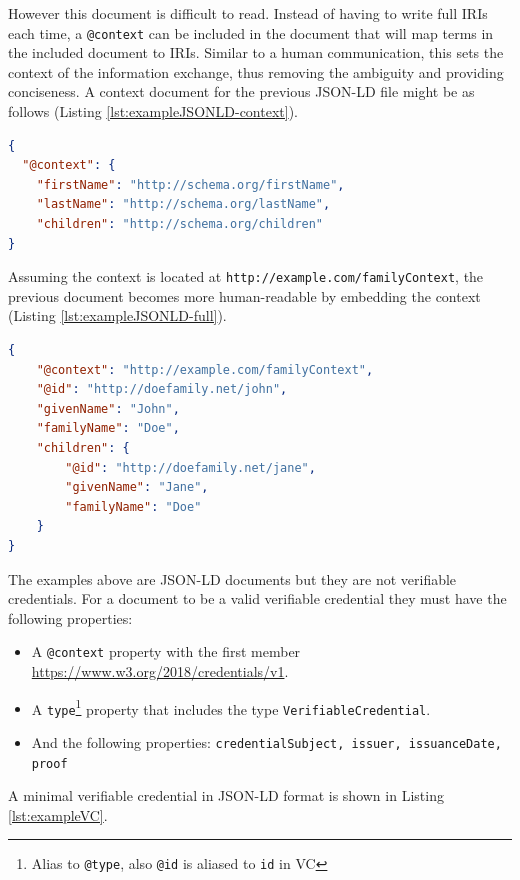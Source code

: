 However this document is difficult to read. Instead of having to write full \acrshort{IRI}s each time, a \lstinline{@context} can be included in the document that will map terms in the included document to \acrshort{IRI}s. Similar to a human communication, this sets the context of the information exchange, thus removing the ambiguity and providing conciseness. A context document for the previous \acrshort{JSON-LD} file might be as follows (Listing \ref{lst:exampleJSONLD-context}).

\begin{lstlisting}[language=json, label={lst:exampleJSONLD-context}, caption={A context file}]
{
  "@context": {
    "firstName": "http://schema.org/firstName",
    "lastName": "http://schema.org/lastName",
    "children": "http://schema.org/children"
}
\end{lstlisting}

Assuming the context is located at \lstinline{http://example.com/familyContext}, the previous document becomes more human-readable by embedding the context (Listing \ref{lst:exampleJSONLD-full}).

\begin{lstlisting}[language=json, label={lst:exampleJSONLD-full}, caption={A context added JSON-LD with shortened terms}]
{
    "@context": "http://example.com/familyContext",
    "@id": "http://doefamily.net/john",
    "givenName": "John",
    "familyName": "Doe",
    "children": {
        "@id": "http://doefamily.net/jane",
        "givenName": "Jane",
        "familyName": "Doe"
    }
}
\end{lstlisting}

The examples above are \acrshort{JSON-LD} documents but they are not verifiable credentials. For a document to be a valid verifiable credential they must have the following properties:
\begin{itemize}
    \item A \lstinline{@context} property with the first member \url{https://www.w3.org/2018/credentials/v1}.
    \item A \lstinline{type}\footnote{Alias to \lstinline{@type}, also \lstinline{@id} is aliased to \lstinline{id} in \acrshort{VC}} property that includes the type \lstinline{VerifiableCredential}.
    \item And the following properties: \lstinline{credentialSubject, issuer, issuanceDate, proof}
\end{itemize}

A minimal verifiable credential in \acrshort{JSON-LD} format is shown in Listing \ref{lst:exampleVC}.


